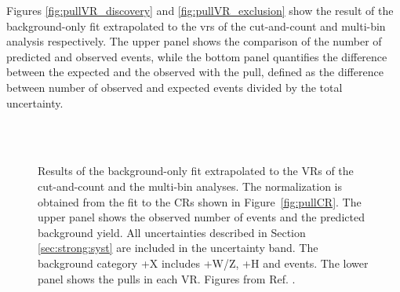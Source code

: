 Figures \ref{fig:pullVR_discovery} and \ref{fig:pullVR_exclusion} show the result of the background-only fit extrapolated to the \glspl{vr} of 
the cut-and-count and multi-bin analysis respectively. The upper panel shows the comparison of the number of predicted and observed events, 
while the bottom panel quantifies the difference between the expected and the observed with the pull, defined as the difference between 
number of observed and expected events divided by the total uncertainty. 

\begin{figure}[htbp]
	\centering
	\\
	\\
	\caption{Results of the background-only fit extrapolated to the VRs of  the cut-and-count and 
		the multi-bin analyses. The \ttbar normalization 
		is obtained from the fit to the CRs shown in Figure~\ref{fig:pullCR}. The upper panel shows 
		the observed number of events and the predicted background yield.
		All uncertainties  described in Section \ref{sec:strong:syst} are included in the 
		uncertainty band. The background category \ttbar+X includes \ttbar+W/Z, 
		\ttbar+H and \ttbar\ttbar events. The lower panel shows the pulls in 
		each VR.  Figures from Ref. \cite{Aaboud:2017hrg}.
	} 
	\label{fig:pullVR}
\end{figure}

